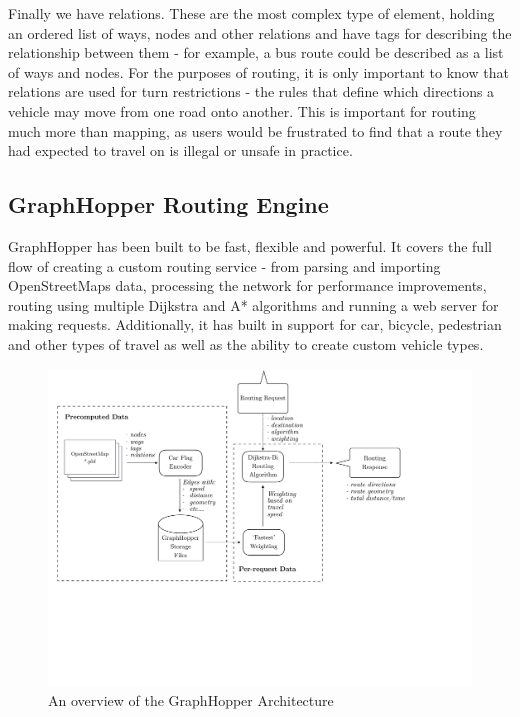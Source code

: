 \documentclass[ %
                    author={Alexander Hill},
                supervisor={Dr. Benjamin Sach},
                    degree={MEng},
                     title={MARMOSET},
                  subtitle={Multi-Agent Route Management using Online Simulation for Efficient Transportation},
                      type={research},
                      year={2016} ]{dissertation}
\begin{document}
Finally we have relations. These are the most complex type of element, holding
an ordered list of ways, nodes and other relations and have tags for describing
the relationship between them - for example, a bus route could be described as a
list of ways and nodes. For the purposes of routing, it is only important to
know that relations are used for turn restrictions - the rules that define which
directions a vehicle may move from one road onto another. This is important for
routing much more than mapping, as users would be frustrated to find that a
route they had expected to travel on is illegal or unsafe in practice.

\subsection{GraphHopper Routing Engine}

GraphHopper has been built to be fast, flexible and powerful. It covers the full
flow of creating a custom routing service - from parsing and importing
OpenStreetMaps data, processing the network for performance improvements,
routing using multiple Dijkstra and A* algorithms and running a web server for
making requests. Additionally, it has built in support for car, bicycle,
pedestrian and other types of travel as well as the ability to create custom
vehicle types.

\begin{figure}[p]
    \centering
    \includegraphics[scale=0.5,page=1,clip,trim=0 8cm 4cm 0]{architecture}
    \caption{An overview of the GraphHopper Architecture}\label{fig:gh-arch}
\end{figure}
\end{document}
